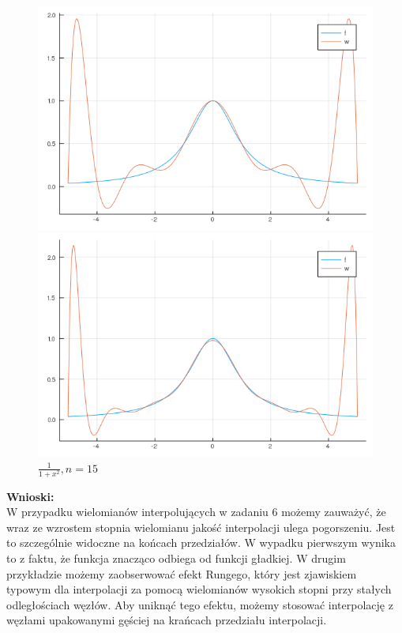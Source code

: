 \documentclass[12pt]{article}
\begin{document}
\begin{figure}[!htb]
  \includegraphics[width=\linewidth]{myplot_4_10.png}
  \caption{$\frac{1}{1+x^2}, n=10$}
\endminipage\hfill
{}
  \includegraphics[width=\linewidth]{myplot_4_15.png}
  \caption{$\frac{1}{1+x^2}, n=15$}
\endminipage
\end{figure}

\noindent \textbf{Wnioski:}\\
W przypadku wielomianów interpolujących w zadaniu 6 możemy zauważyć, że wraz ze wzrostem stopnia wielomianu jakość interpolacji ulega pogorszeniu. Jest to szczególnie widoczne na końcach przedziałów. W wypadku pierwszym wynika to z faktu, że funkcja znacząco odbiega od funkcji gładkiej. W drugim przykładzie
 możemy zaobserwować efekt Rungego, który jest zjawiskiem typowym dla interpolacji za pomocą wielomianów wysokich stopni przy stałych odległościach węzłów. Aby uniknąć tego efektu, możemy stosować interpolację z węzłami upakowanymi gęściej na krańcach przedziału interpolacji.
\end{document}

